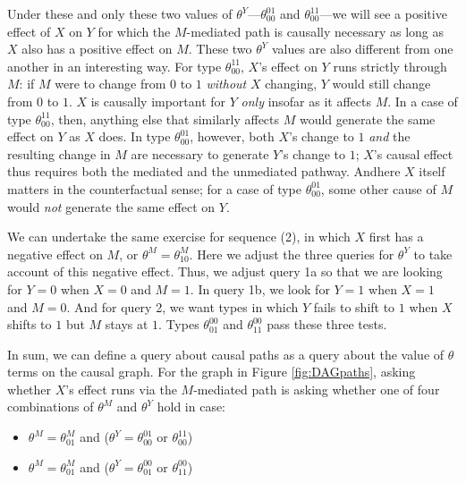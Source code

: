 \documentclass[
  12pt,
]{book}
\providecommand{\tightlist}{%
  \setlength{\itemsep}{0pt}\setlength{\parskip}{0pt}}
\begin{document}
Under these and only these two values of \(\theta^Y\)---\(\theta_{00}^{01}\) and \(\theta_{00}^{11}\)---we will see a positive effect of \(X\) on \(Y\) for which the \(M\)-mediated path is causally necessary as long as \(X\) also has a positive effect on \(M\). These two \(\theta^Y\) values are also different from one another in an interesting way. For type \(\theta_{00}^{11}\), \(X\)'s effect on \(Y\) runs strictly through \(M\): if \(M\) were to change from \(0\) to \(1\) \emph{without} \(X\) changing, \(Y\) would still change from \(0\) to \(1\). \(X\) is causally important for \(Y\) \emph{only} insofar as it affects \(M\). In a case of type \(\theta_{00}^{11}\), then, anything else that similarly affects \(M\) would generate the same effect on \(Y\) as \(X\) does. In type \(\theta_{00}^{01}\), however, both \(X\)'s change to \(1\) \emph{and} the resulting change in \(M\) are necessary to generate \(Y\)'s change to \(1\); \(X\)'s causal effect thus requires both the mediated and the unmediated pathway. Andhere \(X\) itself matters in the counterfactual sense; for a case of type \(\theta_{00}^{01}\), some other cause of \(M\) would \emph{not} generate the same effect on \(Y\).

We can undertake the same exercise for sequence (2), in which \(X\) first has a negative effect on \(M\), or \(\theta^M=\theta^M_{10}\). Here we adjust the three queries for \(\theta^Y\) to take account of this negative effect. Thus, we adjust query 1a so that we are looking for \(Y=0\) when \(X=0\) and \(M=1\). In query 1b, we look for \(Y=1\) when \(X=1\) and \(M=0\). And for query 2, we want types in which \(Y\) fails to shift to \(1\) when \(X\) shifts to \(1\) but \(M\) stays at \(1\). Types \(\theta_{01}^{00}\) and \(\theta_{11}^{00}\) pass these three tests.

In sum, we can define a query about causal paths as a query about the value of \(\theta\) terms on the causal graph. For the graph in Figure \ref{fig:DAGpaths}, asking whether \(X\)'s effect runs via the \(M\)-mediated path is asking whether one of four combinations of \(\theta^M\) and \(\theta^Y\) hold in case:

\begin{itemize}
\tightlist
\item
  \(\theta^M=\theta^M_{01}\) and (\(\theta^Y=\theta_{00}^{01}\) or \(\theta_{00}^{11}\))
\item
  \(\theta^M=\theta^M_{01}\) and (\(\theta^Y=\theta_{01}^{00}\) or \(\theta_{11}^{00}\))
\end{itemize}
\end{document}

